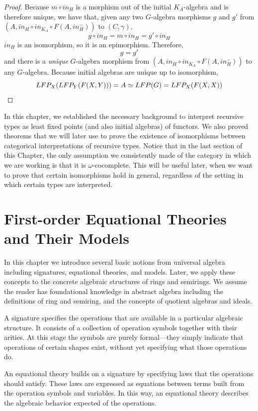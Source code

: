 \documentclass{msthesis}
\theoremstyle{definition}
\begin{document}
\begin{proof}
    Because $m \circ in_H$ is a morphism out of the initial $K_A$-algebra and is therefore unique, we have that, given any two $G$-algebra morphisms $g$ and $g'$ from $(A, in_H \circ in_{K_{A}} \circ F(A, in^-_H))$ to $(C, \gamma)$,
    \[ g \circ in_H = m \circ in_H = g' \circ in_H \]
    $in_H$ is an isomorphism, so it is an epimorphism.  Therefore,
    \[ g = g' \]
    and there is a \emph{unique} $G$-algebra morphism from $(A, in_H \circ in_{K_{A}} \circ F(A, in^-_H))$ to any $G$-algebra.  Because initial algebras are unique up to isomorphism,
    \[ LFP_X(LFP_Y(F(X, Y))) = A \simeq LFP(G) = LFP_X(F(X,X)) \qedhere \]
\end{proof}

In this chapter, we established the necessary background to interpret recursive types as least fixed points (and also initial algebras) of functors.  We also proved theorems that we will later use to prove the existence of isomorphisms between categorical interpretations of recursive types.  Notice that in the last section of this Chapter, the only assumption we consistently made of the category in which we are working is that it is $\omega$-cocomplete.  This will be useful later, when we want to prove that certain isomorphisms hold in general, regardless of the setting in which certain types are interpreted.

\chapter{First-order Equational Theories and Their Models}\label{sec:eqtheory}

In this chapter we introduce several basic notions from universal algebra including signatures, equational theories, and models.  Later, we apply these concepts to the concrete algebraic structures of rings and semirings.  We assume the reader has foundational knowledge in abstract algebra including the definitions of ring and semiring, and the concepts of quotient algebras and ideals.

A signature specifies the operations that are available in a particular algebraic structure. It consists of a collection of operation symbols together with their arities. At this stage the symbols are purely formal---they simply indicate that operations of certain shapes exist, without yet specifying what those operations do.

An equational theory builds on a signature by specifying laws that the operations should satisfy. These laws are expressed as equations between terms built from the operation symbols and variables. In this way, an equational theory describes the algebraic behavior expected of the operations.
\end{document}
